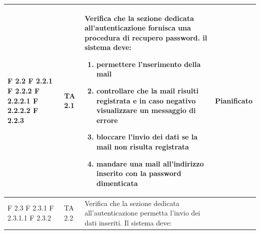 \documentclass[a4paper,11pt]{article}
\begin{document}
\begin{longtable}{p{}p{}p{}p{}}
F 2.2 \newline F 2.2.1 \newline F 2.2.2 \newline F 2.2.2.1 \newline F 2.2.2.2 \newline F 2.2.3&TA 2.1&Verifica che la sezione dedicata all'autenticazione fornisca una procedura di recupero password. il sistema deve:
\begin{enumerate}
\item permettere l'nserimento della mail
\item controllare che la mail risulti registrata e in caso negativo visualizzare un messaggio di errore
\item bloccare l'invio dei dati se la mail non risulta registrata
\item mandare una mail all'indirizzo inserito con la password dimenticata
\end{enumerate} & Pianificato\\
\midrule
F 2.3 \newline F 2.3.1 \newline F 2.3.1.1 \newline F 2.3.2 & TA 2.2& Verifica che la sezione dedicata all'autenticazione permetta l'invio dei dati inseriti. Il sistema deve: 

\end{longtable}
\end{document}
